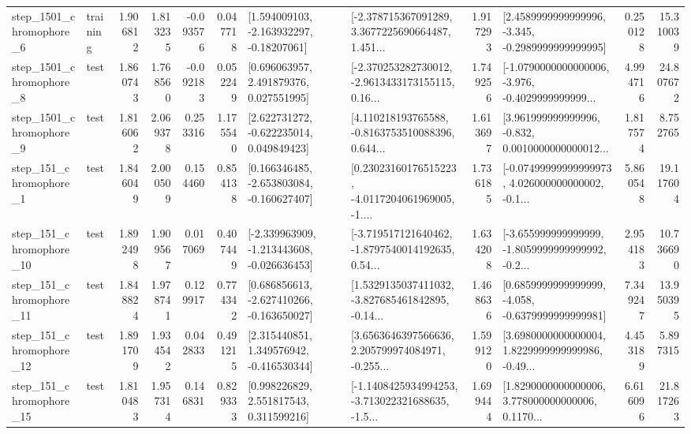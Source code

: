 \begin{tabular}{llrrrrllrlrr}
  step\_1501\_chromophore\_6 &  training &      1.906812 &    1.813235 &     -0.093576 &  0.047718 &    [1.594009103, -2.163932297, -0.18207061] &  [-2.378715367091289, 3.3677225690664487, 1.451... &       1.917293 &  [2.4589999999999996, -3.345, -0.2989999999999995] &            0.250128 &         15.310039 \\
  step\_1501\_chromophore\_8 &      test &      1.860743 &    1.768560 &     -0.092183 &  0.052249 &     [0.696063957, 2.491879376, 0.027551995] &  [-2.370253282730012, -2.9613433173155115, 0.16... &       1.749256 &  [-1.0790000000000006, -3.976, -0.4029999999999... &            4.994716 &         24.807672 \\
  step\_1501\_chromophore\_9 &      test &      1.816062 &    2.069378 &      0.253316 &  1.175540 &    [2.622731272, -0.622235014, 0.049849423] &  [4.110218193765588, -0.8163753510088396, 0.644... &       1.613697 &  [3.961999999999996, -0.832, 0.0010000000000012... &            1.817574 &          8.752765 \\
   step\_151\_chromophore\_1 &      test &      1.846049 &    2.000509 &      0.154460 &  0.854138 &   [0.166346485, -2.653803084, -0.160627407] &  [0.23023160176515223, -4.0117204061969005, -1.... &       1.736185 &  [-0.07499999999999973, 4.026000000000002, -0.1... &            5.860548 &         19.117604 \\
  step\_151\_chromophore\_10 &      test &      1.892498 &    1.909567 &      0.017069 &  0.407449 &  [-2.339963909, -1.213443608, -0.026636453] &  [-3.719517121640462, -1.8797540014192635, 0.54... &       1.634208 &  [-3.655999999999999, -1.8059999999999992, -0.2... &            2.954183 &         10.736690 \\
  step\_151\_chromophore\_11 &      test &      1.848824 &    1.978741 &      0.129917 &  0.774342 &   [0.686856613, -2.627410266, -0.163650027] &  [1.5329135037411032, -3.827685461842895, -0.14... &       1.468636 &  [0.6859999999999999, -4.058, -0.6379999999999981] &            7.349247 &         13.950395 \\
  step\_151\_chromophore\_12 &      test &      1.891709 &    1.934542 &      0.042833 &  0.491215 &    [2.315440851, 1.349576942, -0.416530344] &  [3.6563646397566636, 2.205799974084971, -0.255... &       1.599120 &  [3.6980000000000004, 1.8229999999999986, -0.49... &            4.453189 &          5.897315 \\
  step\_151\_chromophore\_15 &      test &      1.810483 &    1.957314 &      0.146831 &  0.829333 &     [0.998226829, 2.551817543, 0.311599216] &  [-1.1408425934994253, -3.713022321688635, -1.5... &       1.699444 &  [1.8290000000000006, 3.778000000000006, 0.1170... &            6.616096 &         21.817263 \\

\end{tabular}
